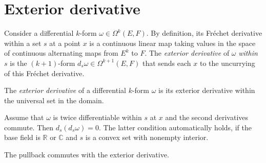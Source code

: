 \section{Exterior derivative}%
\label{sec:exterior-derivative}

\begin{definition}%
  \label{def:ederivWithin}
  Consider a differential \(k\)-form \(\omega \in \Omega^{k}(E, F)\).
  By definition, its Fréchet derivative within a set \(s\) at a point \(x\)
  is a continuous linear map taking values in the space of continuous alternating maps from \(E^{k}\) to \(F\).
  The \emph{exterior derivative} of \(\omega\) \emph{within} \(s\) is the \((k + 1)\)-form \(d_{s}\omega\in\Omega^{k + 1}(E, F)\)
  that sends each \(x\) to the uncurrying of this Fréchet derivative.
\end{definition}

\begin{definition}%
  \label{def:ederiv}
  The \emph{exterior derivative} of a differential \(k\)-form \(\omega\)
  is its exterior derivative within the universal set in the domain.
\end{definition}

\begin{theorem}
  Assume that \(\omega\) is twice differentiable within \(s\) at \(x\)
  and the second derivatives commute. Then \(d_{s}(d_{s}\omega) = 0\).
  The latter condition automatically holds, if the base field is
  \(\mathbb R\) or \(\mathbb C\) and \(s\) is a convex set with
  nonempty interior.
\end{theorem}

\begin{theorem}
  The pullback commutes with the exterior derivative.
\end{theorem}

